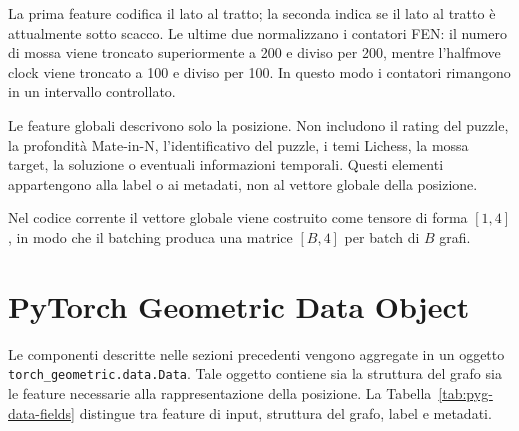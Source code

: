 La prima feature codifica il lato al tratto; la seconda indica se il lato al tratto \`e attualmente sotto scacco. Le ultime due normalizzano i contatori FEN: il numero di mossa viene troncato superiormente a 200 e diviso per 200, mentre l'halfmove clock viene troncato a 100 e diviso per 100. In questo modo i contatori rimangono in un intervallo controllato.

Le feature globali descrivono solo la posizione. Non includono il rating del puzzle, la profondit\`a Mate-in-N, l'identificativo del puzzle, i temi Lichess, la mossa target, la soluzione o eventuali informazioni temporali. Questi elementi appartengono alla label o ai metadati, non al vettore globale della posizione.

Nel codice corrente il vettore globale viene costruito come tensore di forma \([1,4]\), in modo che il batching produca una matrice \([B,4]\) per batch di \(B\) grafi.

\section{PyTorch Geometric Data Object}

Le componenti descritte nelle sezioni precedenti vengono aggregate in un oggetto \texttt{torch\_geometric.data.Data}. Tale oggetto contiene sia la struttura del grafo sia le feature necessarie alla rappresentazione della posizione. La Tabella~\ref{tab:pyg-data-fields} distingue tra feature di input, struttura del grafo, label e metadati.

